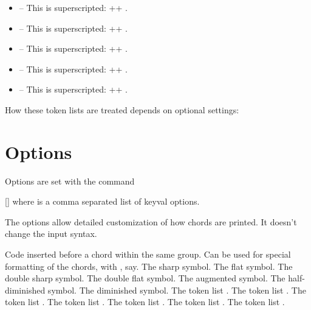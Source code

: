 \documentclass[load-preamble+]{cnltx-doc}
\begin{document}
\begin{itemize}
  \item {} -- This is superscripted: \verbcode++
    .
  \item {} -- This is superscripted: \verbcode++
    .
  \item {} -- This is superscripted: \verbcode++
    .
  \item {} -- This is superscripted: \verbcode++
    .
  \item {} -- This is superscripted: \verbcode++
    .
\end{itemize}

How these token lists are treated depends on optional settings:

\begin{example}
   
   
\end{example}

\section{Options}

Options are set with the command
\begin{commands}
  []
    where  is a comma separated list of keyval options.
\end{commands}

The options allow detailed customization of how chords are printed.  It
doesn't change the input syntax.

\begin{options}
  \Default
    Code inserted before a chord within the same group. Can be used for
    special formatting of the chords, with , say.
    The sharp symbol.
    The flat symbol.
    The double sharp symbol.
    The double flat symbol.
  \Default{+}
    The augmented symbol.
    The half-diminished symbol.
    The diminished symbol.
    The token list .
    The token list .
    The token list .
  \Default
    The token list .
    The token list .
    The token list .
    The token list .
\end{options}
\end{document}
